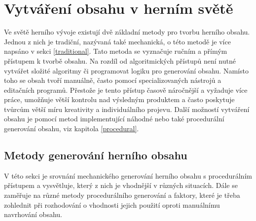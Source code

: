 \chapter{Vytváření obsahu v herním světě} 
\label{theory}
Ve světě herního vývoje existují dvě základní metody pro tvorbu herního obsahu. Jednou z nich je tradiční, nazývaná také mechanická, o této metodě je více napsáno v sekci \ref{traditional}. Tato metoda se vyznačuje ručním a přímým přístupem k tvorbě obsahu. Na rozdíl od algoritmických přístupů není nutné vytvářet složité algoritmy či programovat logiku pro generování obsahu. Namísto toho se obsah tvoří manuálně, často pomocí specializovaných nástrojů a editačních programů. Přestože je tento přístup časově náročnější a vyžaduje více práce, umožňuje větší kontrolu nad výsledným produktem a často poskytuje tvůrcům větší míru kreativity a individuálního projevu. Další možností vytváření obsahu je pomocí metod implementující náhodné nebo také procedurální generování obsahu, viz kapitola \ref{procedural}. 

\section{Metody generování herního obsahu}

V této sekci je srovnání mechanického generování herního obsahu s procedurálním přístupem a vysvětluje, který z nich je vhodnější v různých situacích. Dále se zaměřuje na různé metody procedurálního generování a faktory, které je třeba zohlednit při rozhodování o vhodnosti jejich použití oproti manuálnímu navrhování obsahu.

